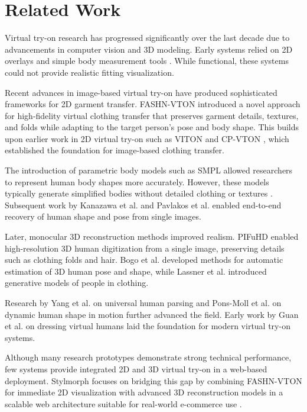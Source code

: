 \documentclass[conference]{IEEEtran}
\begin{document}
\section{Related Work}

Virtual try-on research has progressed significantly over the last decade due to advancements in computer vision and 3D modeling. Early systems relied on 2D overlays and simple body measurement tools \cite{b12}. While functional, these systems could not provide realistic fitting visualization.

Recent advances in image-based virtual try-on have produced sophisticated frameworks for 2D garment transfer. FASHN-VTON \cite{b23} introduced a novel approach for high-fidelity virtual clothing transfer that preserves garment details, textures, and folds while adapting to the target person's pose and body shape. This builds upon earlier work in 2D virtual try-on such as VITON \cite{b24} and CP-VTON \cite{b25}, which established the foundation for image-based clothing transfer.

The introduction of parametric body models such as SMPL allowed researchers to represent human body shapes more accurately. However, these models typically generate simplified bodies without detailed clothing or textures \cite{b3}. Subsequent work by Kanazawa et al. \cite{b14} and Pavlakos et al. \cite{b15} enabled end-to-end recovery of human shape and pose from single images.

Later, monocular 3D reconstruction methods improved realism. PIFuHD \cite{b1} enabled high-resolution 3D human digitization from a single image, preserving details such as clothing folds and hair. Bogo et al. \cite{b16} developed methods for automatic estimation of 3D human pose and shape, while Lassner et al. \cite{b17} introduced generative models of people in clothing.

Research by Yang et al. \cite{b18} on universal human parsing and Pons-Moll et al. \cite{b19} on dynamic human shape in motion further advanced the field. Early work by Guan et al. \cite{b20} on dressing virtual humans laid the foundation for modern virtual try-on systems.

Although many research prototypes demonstrate strong technical performance, few systems provide integrated 2D and 3D virtual try-on in a web-based deployment. Stylmorph focuses on bridging this gap by combining FASHN-VTON for immediate 2D visualization with advanced 3D reconstruction models in a scalable web architecture suitable for real-world e-commerce use \cite{b11}.
\end{document}
